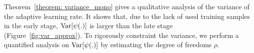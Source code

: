 Theorem~\ref{theorem: variance_mono} gives a qualitative analysis of the variance of the adaptive learning rate.
It shows that, due to the lack of used training samples in the early stage, $\operatorname{{\rm Var}}[\psi(.)]$ is larger than the late stage (Figure~\ref{fig:var_approx}).
To rigorously constraint the variance, we perform a quantified analysis on $\operatorname{{\rm Var}}[\psi(.)]$ by estimating the degree of freedoms $\rho$. 




